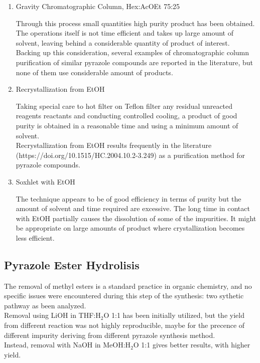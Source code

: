 \documentclass[../Master.tex]{subfiles}
\begin{document}
\begin{enumerate}
	\item  Gravity Chromatographic Column, Hex:AcOEt 75:25

	      Through this process small quantities high purity product has been obtained. The operations itself is not time efficient and takes up large amount of solvent, leaving behind a considerable quantity of product of interest.\\
	      Backing up this consideration, several examples of chromatographic column purification of similar pyrazole compounds are reported in the literature, but none of them use considerable amount of products.
	\item Recrystallization from EtOH

	      Taking special care to hot filter on Teflon filter any residual unreacted reagents reactants and conducting controlled cooling, a product of good purity is obtained in a reasonable time and using a minimum amount of solvent. \\
	      Recrystallization from EtOH results frequently in the literature (https://doi.org/10.1515/HC.2004.10.2-3.249) as a purification method for pyrazole compounds.
	\item Soxhlet with EtOH

	      The technique appears to be of good efficiency in terms of purity but the amount of solvent and time required are excessive. The long time in contact with EtOH partially causes the dissolution of some of the impurities. It might be appropriate on large amounts of product where
	      crystallization becomes less efficient.
\end{enumerate}
\subsection{Pyrazole Ester Hydrolisis}\label{sec:pyrazole-hydro}

The removal of methyl esters is a standard practice in organic chemistry, and no specific issues were encountered during this step of the synthesis: two sythetic pathway as been analyzed.\\
Removal using LiOH in THF:H$_2$O 1:1 has been initially utilized, but the yield from different reaction was not highly reproducible, maybe for the precence of different impurity deriving from different pyrazole synthesis method.\\
Instead, removal with NaOH in MeOH:H$_{2}$O 1:1 gives better results, with higher yield.
\end{document}
